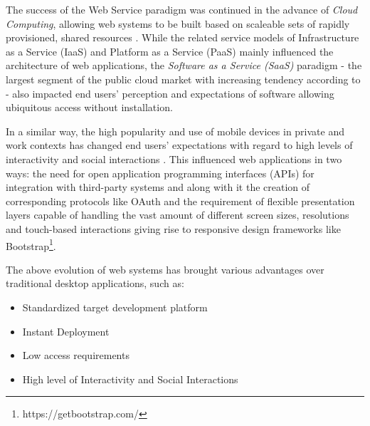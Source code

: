 The success of the Web Service paradigm was continued in the advance of \emph{Cloud Computing}, allowing web systems to be built based on scaleable sets of rapidly provisioned, shared resources \autocite{NIST2011CloudComputing}.
While the related service models of Infrastructure as a Service (IaaS) and Platform as a Service (PaaS) mainly influenced the architecture of web applications, the \emph{Software as a Service (SaaS)} paradigm - the largest segment of the public cloud market with increasing tendency according to \autocite{Statista2018SaaSStatistics} - also impacted end users' perception and expectations of software \autocite{BetterCloud2017SaaSWorkplace,Fowley2017CloudSME} allowing ubiquitous access without installation.

In a similar way, the high popularity and use of mobile devices \autocite{Statista2018MobileWeb} in private and work contexts has changed end users' expectations with regard to high levels of interactivity and social interactions \autocite{Bitkom2013Arbeit30}.
This influenced web applications in two ways: the need for open application programming interfaces (APIs) for integration with third-party systems and along with it the creation of corresponding protocols like OAuth \autocite{Hardt2012Oauth2.0} and the requirement of flexible presentation layers capable of handling the vast amount of different screen sizes, resolutions and touch-based interactions giving rise to responsive design frameworks like Bootstrap\footnote{https://getbootstrap.com/}.

The above evolution of web systems has brought various advantages over traditional desktop applications, such as:

\begin{itemize}
\tightlist
\item
  Standardized target development platform
\item
  Instant Deployment
\item
  Low access requirements
\item
  High level of Interactivity and Social Interactions
\end{itemize}

